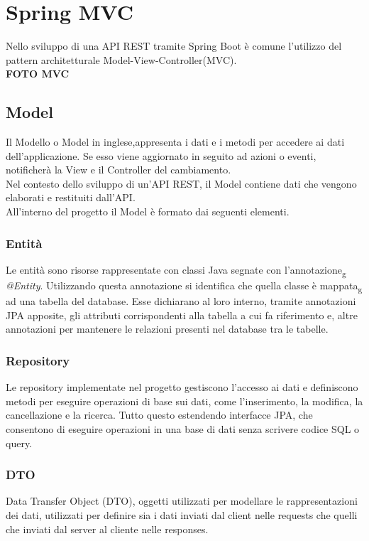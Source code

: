 \section{Spring MVC}
Nello sviluppo di una API REST tramite Spring Boot è comune l'utilizzo del pattern architetturale Model-View-Controller(MVC).\\

\textbf{FOTO MVC}\\

\subsection{Model}
Il Modello o Model in inglese,appresenta i dati e i metodi per accedere ai dati dell'applicazione. Se esso viene aggiornato in seguito ad azioni o eventi, notificherà la View e il Controller del cambiamento.\\
Nel contesto dello sviluppo di un'API REST, il Model contiene dati che vengono elaborati e restituiti dall'API.\\
All'interno del progetto il Model è formato dai seguenti elementi.
\subsubsection{Entità}
Le entità sono risorse rappresentate con classi Java segnate con l'annotazione\textsubscript{g} \textit{@Entity}. Utilizzando questa annotazione si identifica che quella classe è mappata\textsubscript{g} ad una tabella del database. Esse dichiarano al loro interno, tramite annotazioni JPA apposite, gli attributi corrispondenti alla tabella a cui fa riferimento e, altre annotazioni per mantenere le relazioni presenti nel database tra le tabelle.
\subsubsection{Repository}
Le repository implementate nel progetto gestiscono l'accesso ai dati e definiscono metodi per eseguire operazioni di base sui dati, come l'inserimento, la modifica, la cancellazione e la ricerca. Tutto questo estendendo interfacce JPA, che consentono di eseguire operazioni in una base di dati senza scrivere codice SQL o query.
\subsubsection{DTO}
Data Transfer Object (DTO), oggetti utilizzati per modellare le rappresentazioni dei dati, utilizzati per definire sia i dati inviati dal client nelle requests che quelli che inviati dal server al cliente nelle responses.\\

